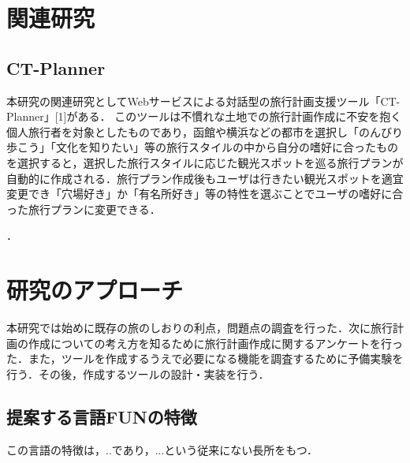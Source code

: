 \documentclass{funthesis}
\begin{document}
\chapter{関連研究}%

\section{CT-Planner}


本研究の関連研究としてWebサービスによる対話型の旅行計画支援ツール「CT-Planner」[1]がある．
このツールは不慣れな土地での旅行計画作成に不安を抱く個人旅行者を対象としたものであり，函館や横浜などの都市を選択し「のんびり歩こう」「文化を知りたい」等の旅行スタイルの中から自分の嗜好に合ったものを選択すると，選択した旅行スタイルに応じた観光スポットを巡る旅行プランが自動的に作成される．旅行プラン作成後もユーザは行きたい観光スポットを適宜変更でき「穴場好き」か「有名所好き」等の特性を選ぶことでユーザの嗜好に合った旅行プランに変更できる．


．


\chapter{研究のアプローチ}%

本研究では始めに既存の旅のしおりの利点，問題点の調査を行った．次に旅行計画の作成についての考え方を知るために旅行計画作成に関するアンケートを行った．また，ツールを作成するうえで必要になる機能を調査するために予備実験を行う．その後，作成するツールの設計・実装を行う．

\section{提案する言語FUNの特徴}

この言語の特徴は，..であり，...という従来にない長所をもつ．
\end{document}

